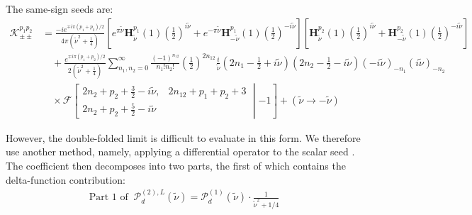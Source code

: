 \documentclass[a4paper,12pt]{article}
\def\tn{\tilde\nu}
\begin{document}
The same-sign seeds are:
\begin{align}
    \mathcal{K}_{\pm\pm}^{p_1p_2}
    &= \frac{-i e^{\mp i\pi(p_1+p_2)/2}}{4\pi(\tilde{\nu}^2 + \frac{1}{4})} 
    \left[ e^{\pi\tilde{\nu}} \mathbf{H}_{\tilde{\nu}}^{p_1}(1) \left(\frac{1}{2}\right)^{i\tilde{\nu}} 
    + e^{-\pi\tilde{\nu}} \mathbf{H}_{-\tilde{\nu}}^{p_1}(1) \left(\frac{1}{2}\right)^{-i\tilde{\nu}} \right]  \left[ \mathbf{H}_{\tilde{\nu}}^{p_2}(1) \left(\frac{1}{2}\right)^{i\tilde{\nu}} + \mathbf{H}_{-\tilde{\nu}}^{p_2}(1) \left(\frac{1}{2}\right)^{-i\tilde{\nu}} \right] \nonumber \\
    &\quad + \frac{e^{\mp i\pi(p_1+p_2)/2}}{2(\tilde{\nu}^2 + \frac{1}{4})}  
    \sum_{n_1,n_2=0}^{\infty} \frac{(-1)^{n_{12}}}{n_1! n_2!} \left( \frac{1}{2} \right)^{2n_{12}} \frac{i}{\tilde{\nu}} \left( 2n_1 - \frac{1}{2} + i\tilde{\nu} \right) \left( 2n_2 - \frac{1}{2} - i\tilde{\nu} \right) (-i\tilde{\nu})_{-n_1} (i\tilde{\nu})_{-n_2} \nonumber \\
    &\quad \times \mathcal{F} \left[ \begin{matrix} 2n_2 + p_2 + \frac{3}{2} - i\tilde{\nu}, & 2n_{12} + p_1 + p_2 + 3 \\ 2n_2 + p_2 + \frac{5}{2} - i\tilde{\nu} \end{matrix} \middle| -1 \right] + (\tilde{\nu} \rightarrow -\tilde{\nu})
\end{align}

However, the double-folded limit is difficult to evaluate in this form.
We therefore use another method, namely, applying a differential operator to the scalar seed \cite{qin_closed-form_2023}.
The coefficient then decomposes into two parts, the first of which contains the delta-function contribution:
\begin{align}
    \text{Part 1 of}\;\; \mathcal{P}_d^{(2),L}(\tn) = \mathcal{P}_d^{(1)}(\tn) \cdot \frac{1}{\tn^2+1/4}
\end{align}
\end{document}
